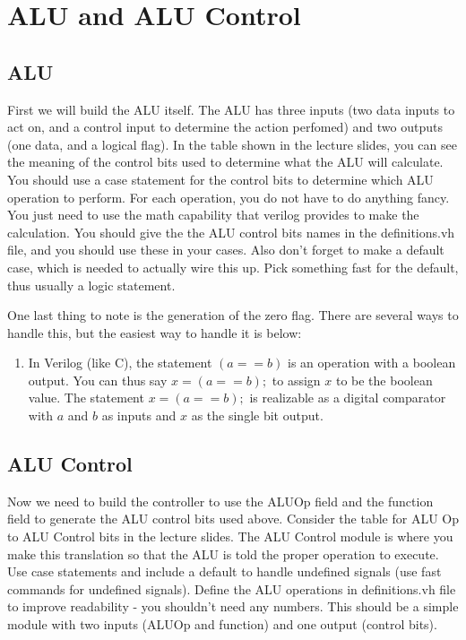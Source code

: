 \chapter{ALU and ALU Control}

\section{ALU}

First we will build the ALU itself.  The ALU has three inputs (two data inputs to act on, and a control input to determine the action perfomed) and two outputs (one data, and a logical flag). In the table shown in the lecture slides, you can see the meaning of the control bits used to determine what the ALU will calculate.  You should use a case statement for the control bits to determine which ALU operation to perform.  For each operation, you do not have to do anything fancy.  You just need to use the math capability that verilog provides to make the calculation.  You should give the the ALU control bits names in the definitions.vh file, and you should use these in your cases.  Also don't forget to make a default case, which is needed to actually wire this up.  Pick something fast for the default, thus usually a logic statement.

One last thing to note is the generation of the zero flag.  There are several ways to handle this, but the easiest way to handle it is below: 
\begin{enumerate}
\item In Verilog (like C), the statement $(a==b)$ is an operation with a boolean output.  You can thus say $x=(a==b);$ to assign $x$ to be the boolean value.  The statement $x=(a==b);$ is realizable as a digital comparator with $a$ and $b$ as inputs and $x$ as the single bit output.
\end{enumerate}

\section{ALU Control}

Now we need to build the controller to use the ALUOp field and the function field to generate the ALU control bits used above.  Consider the table for ALU Op to ALU Control bits in the lecture slides.  The ALU Control module is where you make this translation so that the ALU is told the proper operation to execute.  Use case statements and include a default to handle undefined signals (use fast commands for undefined signals).  Define the ALU operations in definitions.vh file to improve readability - you shouldn't need any numbers.  This should be a simple module with two inputs (ALUOp and function) and one output (control bits).

